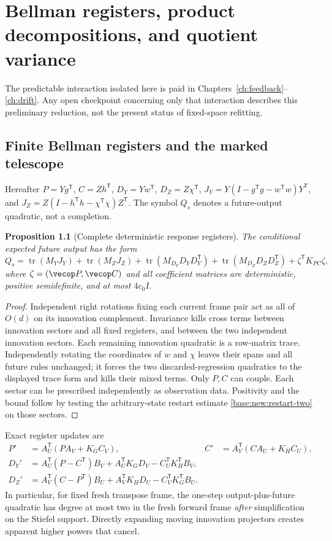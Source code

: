 \documentclass[11pt,oneside,openany,a4paper]{book}
\numberwithin{equation}{chapter}
\newtheorem{proposition}[theorem]{Proposition}
\theoremstyle{definition}
\theoremstyle{remark}
\newcommand{\T}{\mathsf T}\newcommand{\Id}{I}
\DeclareMathOperator{\tr}{tr}\DeclareMathOperator{\rank}{rank}
\begin{document}
\chapter{Bellman registers, product decompositions, and quotient variance}\label{ch:predictable}
\begin{scopebox}
The predictable interaction isolated here is paid in Chapters~\ref{ch:feedback}--\ref{ch:drift}. Any open checkpoint concerning only that interaction describes this preliminary reduction, not the present status of fixed-space refitting.
\end{scopebox}
\section{Finite Bellman registers and the marked telescope}\label{base:con:bellman}
Hereafter $P=Yg^\T$, $C=Zh^\T$, $D_Y=Yw^\T$, $D_Z=Z\chi^\T$,
$J_Y=Y(I-g^\T g-w^\T w)Y^\T$, and
$J_Z=Z(I-h^\T h-\chi^\T\chi)Z^\T$.
The symbol $Q_s$ denotes a future-output quadratic, not a completion.

\begin{proposition}[Complete deterministic response registers]\label{base:con:registers}
The conditional expected future output has the form
\begin{equation}\label{base:con:five-total}
 Q_s=\tr(M_YJ_Y)+\tr(M_ZJ_Z)
 +\tr(M_{D_Y}D_YD_Y^\T)+\tr(M_{D_Z}D_ZD_Z^\T)
 +\zeta^\T K_{PC}\zeta,
\end{equation}
where $\zeta=(\vecop P,\vecop C)$ and all coefficient matrices are deterministic, positive semidefinite, and at most $4c_0I$.
\end{proposition}
\begin{proof}
Independent right rotations fixing each current frame pair act as all of $O(d)$ on its innovation complement. Invariance kills cross terms between innovation sectors and all fixed registers, and between the two independent innovation sectors. Each remaining innovation quadratic is a row-matrix trace. Independently rotating the coordinates of $w$ and $\chi$ leaves their spans and all future rules unchanged; it forces the two discarded-regression quadratics to the displayed trace form and kills their mixed terms. Only $P,C$ can couple. Each sector can be prescribed independently as observation data. Positivity and the bound follow by testing the arbitrary-state restart estimate \eqref{base:new:restart-two} on those sectors.
\end{proof}

Exact register updates are
\begin{align}
 P'&=A_U^\T(PA_V+K_GC_V),&
 C'&=A_V^\T(CA_U+K_HC_U),\label{base:con:retained-update}\\
 D_Y'&=A_U^\T(P-C^\T)B_V+A_U^\T K_GD_V-C_U^\T K_H^\T B_V,\label{base:con:DYupdate}\\
 D_Z'&=A_V^\T(C-P^\T)B_U+A_V^\T K_HD_U-C_V^\T K_G^\T B_U.\label{base:con:DZupdate}
\end{align}
In particular, for fixed fresh transpose frame, the one-step output-plus-future quadratic has degree at most two in the fresh forward frame \emph{after} simplification on the Stiefel support. Directly expanding moving innovation projectors creates apparent higher powers that cancel.
\end{document}
